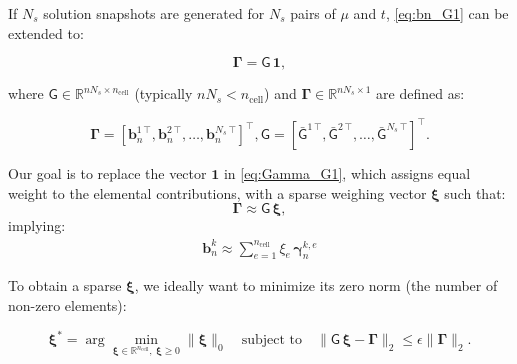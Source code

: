 \documentclass[11pt]{article}
\renewcommand{\vec}[1]{\mathbf{#1}}
\newcommand{\mat}[1]{\mathsf{#1}}
\begin{document}
        If $N_s$ solution snapshots are generated for $N_s$ pairs of $\mu$ and $t$, \cref{eq:bn_G1} can be extended to:

        \begin{equation}
        \boldsymbol{\Gamma} = \mat{G}\, \vec{1},
        \label{eq:Gamma_G1}
        \end{equation}

        where $\mat{G} \in \mathbb{R}^{n N_s \times n_{\text{cell}}}$ (typically $n N_s < n_{\text{cell}}$) and $\boldsymbol{\Gamma} \in \mathbb{R}^{n N_s \times 1}$ are defined as:

        \begin{subequations}
            \begin{equation}
            \boldsymbol{\Gamma} = \left[ \vec{b}_n^{1\,\top}, \vec{b}_n^{2\,\top}, \hdots, \vec{b}_n^{N_s\,\top}\right]^\top,
            \end{equation}
            \begin{equation}
            \mat{G} = \left[ \bar{\mat{G}}^{1\,\top}, \bar{\mat{G}}^{2\,\top}, \hdots, \bar{\mat{G}}^{N_s\,\top}\right]^\top.
            \end{equation}
        \end{subequations}


        Our goal is to replace the vector $\vec{1}$ in \cref{eq:Gamma_G1}, which assigns equal weight to the elemental contributions, with a sparse weighing vector $\boldsymbol{\xi}$ such that:
        \begin{equation}
        \boldsymbol{\Gamma} \approx \mat{G}\, \boldsymbol{\xi},
        \label{eq:Gamma_Gxi}
        \end{equation}
        implying:
        \begin{align}
        \vec{b}^k_n \approx \sum_{e=1}^{n_{\text{cell}}} \xi_e\, \boldsymbol{\gamma}^{k,e}_{n}
        \label{eq:bn_approx}
        \end{align}

        To obtain a sparse $\boldsymbol{\xi}$, we ideally want to minimize its zero norm (the number of non-zero elements):

        \begin{equation}
        \boldsymbol{\xi}^\ast = \arg \min_{\boldsymbol{\xi} \in \mathbb{R}^{n_{\text{cell}}},\ \boldsymbol{\xi} \geq 0} \| \boldsymbol{\xi} \|_0 \quad \text{subject to} \quad \| \mat{G}\, \boldsymbol{\xi} - \boldsymbol{\Gamma} \|_2 \leq \epsilon \| \boldsymbol{\Gamma} \|_2.
        \label{eq:L0_min}
        \end{equation}
\end{document}
